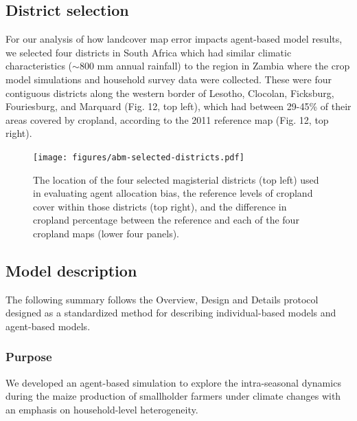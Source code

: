 \documentclass[11pt, titlepage]{article}
\begin{document}
\subsection{\large District selection}
For our analysis of how landcover map error impacts agent-based model results, we selected four districts in South Africa which had similar climatic characteristics ($\sim$800 mm annual rainfall) to the region in Zambia where the crop model simulations and household survey data were collected.  These were four contiguous districts along the western border of Lesotho, Clocolan, Ficksburg, Fouriesburg, and Marquard (Fig. 12, top left), which had between 29-45\% of their areas covered by cropland, according to the 2011 reference map (Fig. 12, top right).  

\begin{figure}[!ht]
  \centering
     \texttt{[image: figures/abm-selected-districts.pdf]} 
      \caption{The location of the four selected magisterial districts (top left) used in evaluating agent allocation bias, the reference levels of cropland cover within those districts (top right), and the difference in cropland percentage between the reference and each of the four cropland maps (lower four panels). }
      \label{fig:default}
\end{figure}

\subsection{\large Model description}

The following summary follows the Overview, Design and Details protocol \citep{grimm_standard_2006,polhill_using_2008} designed as a standardized method for describing individual-based models and agent-based models.

\subsubsection{Purpose} 
We developed an agent-based simulation to explore the intra-seasonal dynamics during the maize production of smallholder farmers under climate changes with an emphasis on household-level heterogeneity.
\end{document}
